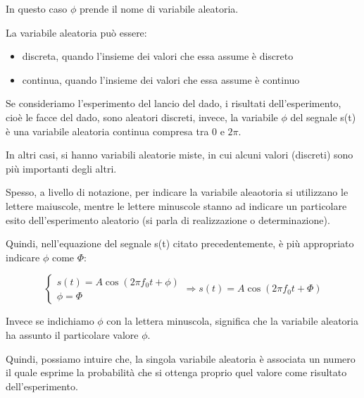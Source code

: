 In questo caso $\phi$ prende il nome di variabile aleatoria. \newline 

La variabile aleatoria può essere: 
\begin{itemize}
    \item discreta, quando l'insieme dei valori che essa assume è discreto 
    \item continua, quando l'insieme dei valori che essa assume è continuo
\end{itemize}

Se consideriamo l'esperimento del lancio del dado, i risultati dell'esperimento, cioè le facce del dado, sono aleatori discreti, 
invece, la variabile $\phi$ del segnale s(t) è una variabile aleatoria continua compresa tra $0$ e $2\pi$. \newline 

In altri casi, si hanno variabili aleatorie miste, in cui alcuni valori (discreti) sono più importanti degli altri. \newline 

Spesso, a livello di notazione, per indicare la variabile aleaotoria si utilizzano le lettere maiuscole, 
mentre le lettere minuscole stanno ad indicare un particolare esito dell'esperimento aleatorio (si parla di realizzazione o determinazione). \newline 

Quindi, nell'equazione del segnale s(t) citato precedentemente, è più appropriato indicare $\phi$ come $\Phi$: 

{
    \Large 
    \begin{equation}
        \begin{cases}
            s(t) = A \cos(2 \pi f_0 t +\phi) \\ 
            \phi = \Phi 
        \end{cases} 
        \Rightarrow 
        s(t) = A \cos(2 \pi f_0 t +\Phi)
    \end{equation}
} 

Invece se indichiamo $\phi$ con la lettera minuscola, significa che la variabile aleatoria ha assunto il particolare valore $\phi$. \newline 

Quindi, possiamo intuire che, la singola variabile aleatoria è associata un numero il quale esprime la probabilità che si ottenga proprio quel valore come risultato dell'esperimento. \newline 

\newpage 

